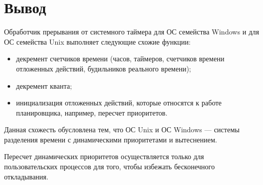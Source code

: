 \chapter*{Вывод}

Обработчик прерывания от системного таймера для ОС семейства Windows и для ОС семейства Unix выполняет следующие схожие функции:
\begin{itemize}
	\item декремент счетчиков времени (часов, таймеров, счетчиков времени отложенных действий, будильников реального времени);
	\item декремент кванта;
	\item инициализация отложенных действий, которые относятся к работе планировщика, например, пересчет приоритетов.
\end{itemize}

Данная схожесть обусловлена тем, что ОС Unix и ОС Windows --- системы разделения времени с динамическими приоритетами и вытеснением.

Пересчет динамических приоритетов осуществляется только для пользовательских процессов для того, чтобы избежать бесконечного откладывания.
